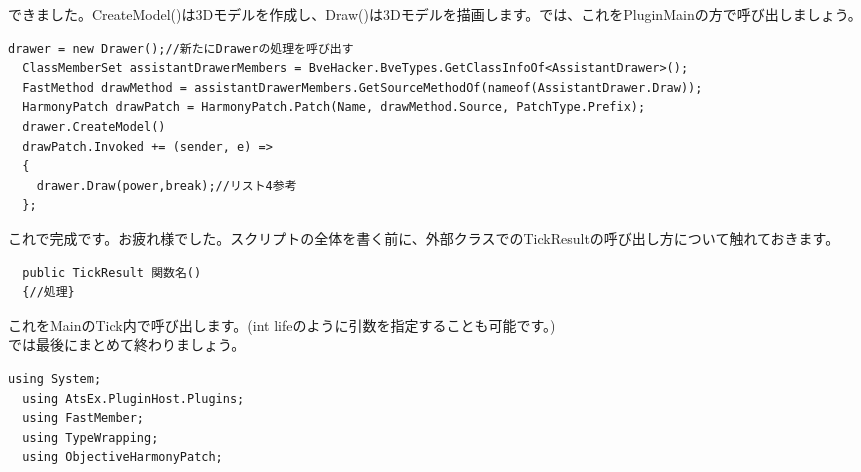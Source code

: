 \documentclass[b5paper,9pt,platex,dvipdfmx]{jsarticle}
\begin{document}
\begin{multicols*}{3}
できました。CreateModel()は3Dモデルを作成し、Draw()は3Dモデルを描画します。では、これをPluginMainの方で呼び出しましょう。\\
\begin{lstlisting}[caption = MapPluginMain()]
  drawer = new Drawer();//新たにDrawerの処理を呼び出す
  ClassMemberSet assistantDrawerMembers = BveHacker.BveTypes.GetClassInfoOf<AssistantDrawer>();
  FastMethod drawMethod = assistantDrawerMembers.GetSourceMethodOf(nameof(AssistantDrawer.Draw));
  HarmonyPatch drawPatch = HarmonyPatch.Patch(Name, drawMethod.Source, PatchType.Prefix);
  drawer.CreateModel()
  drawPatch.Invoked += (sender, e) =>
  {
    drawer.Draw(power,break);//リスト4参考
  };
\end{lstlisting}
これで完成です。お疲れ様でした。スクリプトの全体を書く前に、外部クラスでのTickResultの呼び出し方について触れておきます。\\
\begin{lstlisting}
  public TickResult 関数名()
  {//処理}
\end{lstlisting}
これをMainのTick内で呼び出します。(int lifeのように引数を指定することも可能です。)\\
では最後にまとめて終わりましょう。\\
\begin{lstlisting}[caption = MapPluginMain.cs]
  using System;
  using AtsEx.PluginHost.Plugins;
  using FastMember;
  using TypeWrapping;
  using ObjectiveHarmonyPatch;


\end{lstlisting}
\end{multicols*}
\end{document}
